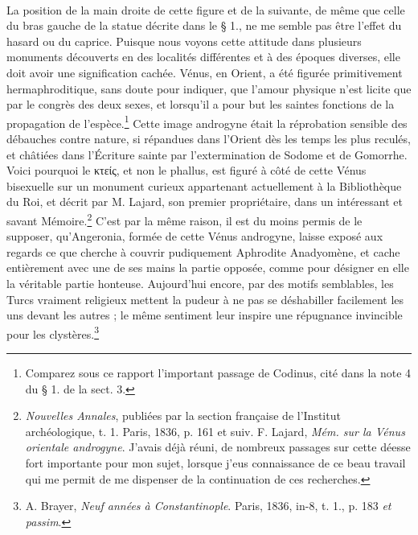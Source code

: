 \documentclass[a4paper, 11pt, oneside, polutonikogreek, french]{article}
\begin{document}
\paragraph{}
La position de la main droite de cette figure et de la suivante, de même que celle du bras gauche de la statue décrite dans le § 1., ne me semble pas être l'effet du hasard ou du caprice. Puisque nous voyons cette attitude dans plusieurs monuments découverts en des localités différentes et à des époques diverses, elle doit avoir une signification cachée. Vénus, en Orient, a été figurée primitivement hermaphroditique, sans doute pour indiquer, que l'amour physique n'est licite que par le congrès des deux sexes, et lorsqu'il a pour but les saintes fonctions de la propagation de l'espèce.\footnote{Comparez sous ce rapport l'important passage de Codinus, cité dans la note 4 du § 1. de la sect. 3.} Cette image androgyne était la réprobation sensible des débauches contre nature, si répandues dans l'Orient dès les temps les plus reculés, et châtiées dans l'Écriture sainte par l'extermination de Sodome et de Gomorrhe. Voici pourquoi le κτείς, et non le phallus, est figuré à côté de cette Vénus bisexuelle sur un monument curieux appartenant actuellement à la Bibliothèque du Roi, et décrit par M. Lajard, son premier propriétaire, dans un intéressant et savant Mémoire.\footnote{\emph{Nouvelles Annales}, publiées par la section française de l'Institut archéologique, t. 1. Paris, 1836, p. 161 et suiv. F. Lajard, \emph{Mém. sur la Vénus orientale androgyne}. J'avais déjà réuni, de nombreux passages sur cette déesse fort importante pour mon sujet, lorsque j'eus connaissance de ce beau travail qui me permit de me dispenser de la continuation de ces recherches.} C'est par la même raison, il est du moins permis de le supposer, qu'Angeronia, formée de cette Vénus androgyne, laisse exposé aux regards ce que cherche à couvrir pudiquement Aphrodite Anadyomène, et cache entièrement avec une de ses mains la partie opposée, comme pour désigner en elle la véritable partie honteuse. Aujourd'hui encore, par des motifs semblables, les Turcs vraiment religieux mettent la pudeur à ne pas se déshabiller facilement les uns devant les autres ; le même sentiment leur inspire une répugnance invincible pour les clystères.\footnote{A. Brayer, \emph{Neuf années à Constantinople}. Paris, 1836, in-8, t. 1., p. 183 \emph{et passim}.}
\end{document}
